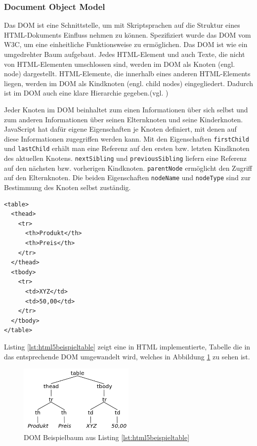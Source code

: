 \subsubsection{Document Object Model} Das DOM ist eine Schnittstelle, um mit Skriptsprachen auf die Struktur eines HTML-Dokuments Einfluss nehmen zu können. Spezifiziert wurde das DOM vom W3C, um eine einheitliche Funktionsweise zu ermöglichen. Das DOM ist wie ein umgedrehter Baum aufgebaut. Jedes HTML-Element und auch Texte, die nicht von HTML-Elementen umschlossen sind, werden im DOM als Knoten (engl. node) dargestellt. HTML-Elemente, die innerhalb eines anderen HTML-Elements liegen, werden im DOM als Kindknoten (engl. child nodes) eingegliedert. Dadurch ist im DOM auch eine klare Hierarchie gegeben.(vgl. \cite[S.350]{WenzJava2008})\par Jeder Knoten im DOM beinhaltet zum einen Informationen über sich selbst und zum anderen Informationen über seinen Elternknoten und seine Kinderknoten. JavaScript hat dafür eigene Eigenschaften je Knoten definiert, mit denen auf diese Informationen zugegriffen werden kann. Mit den Eigenschaften \texttt{firstChild} und \texttt{lastChild} erhält man eine Referenz auf den ersten bzw. letzten Kindknoten des aktuellen Knotens. \texttt{nextSibling} und \texttt{previousSibling} liefern eine Referenz auf den nächsten bzw. vorherigen Kindknoten. \texttt{parentNode} ermöglicht den Zugriff auf den Elternknoten. Die beiden Eigenschaften \texttt{nodeName} und \texttt{nodeType} sind zur Bestimmung des Knoten selbst zuständig.

\vspace{1em}
\begin{lstlisting}[language=HTML5, caption=DOM5 Beispiel Definition, label=lst:html5beispieltable]
<table>
  <thead>
    <tr>
      <th>Produkt</th>
      <th>Preis</th>
    </tr>
  </thead>
  <tbody>
    <tr>
      <td>XYZ</td>
      <td>50,00</td>
    </tr>
  </tbody>
</table>
\end{lstlisting}

Listing \ref{lst:html5beispieltable} zeigt eine in HTML implementierte, Tabelle die in das entsprechende DOM umgewandelt wird, welches in Abbildung \ref{fig:dombeispielbaum} zu sehen ist.

\vspace{1em}
\begin{figure}[htb]
  \centering
  \includegraphics[width=0.5\textwidth]{abb/dom_sampletree}
  \caption[DOM Beispielbaum aus Listing \ref{lst:html5beispieltable}]{DOM Beispielbaum aus Listing \ref{lst:html5beispieltable}}
  \label{fig:dombeispielbaum}
\end{figure}


